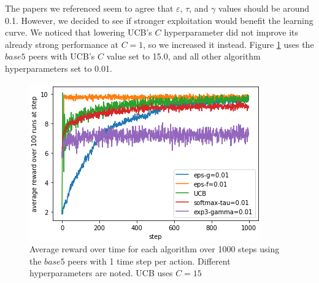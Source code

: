 \documentclass{article}
\begin{document}
The papers we referenced seem to agree that $\varepsilon$, $\tau$, and $\gamma$ values should be around 0.1. However, we decided to see if stronger exploitation would 
benefit the learning curve. We noticed that lowering UCB's $C$ hyperparameter did not improve its already strong performance at $C=1$, so we increased it instead. 
Figure \ref{fig:base5_hps_5algos} uses the $base5$ peers with UCB's $C$ value set to 15.0, and all other algorithm hyperparameters set to 0.01.
\begin{figure}[h]
    \centering
    \includegraphics[width=1\linewidth]{figs/base5_hps_0.01_UCB.png}
    \caption{Average reward over time for each algorithm over 1000 steps using the $base5$ peers with 1 time step per action. Different hyperparameters are noted. UCB 
    uses $C=15$}
    \label{fig:base5_hps_5algos}
\end{figure}
\end{document}
